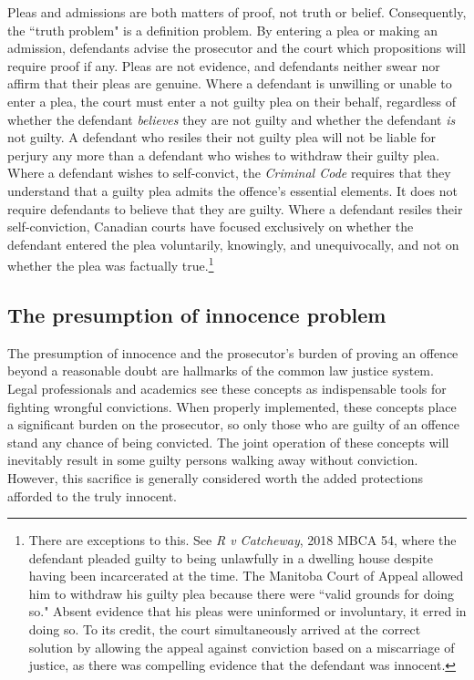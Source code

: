 Pleas and admissions are both matters of proof, not truth or belief. Consequently, the ``truth problem" is a definition problem. By entering a plea or making an admission, defendants advise the prosecutor and the court which propositions will require proof if any. Pleas are not evidence, and defendants neither swear nor affirm that their pleas are genuine. Where a defendant is unwilling or unable to enter a plea, the court must enter a not guilty plea on their behalf, regardless of whether the defendant \textit{believes} they are not guilty and whether the defendant \textit{is} not guilty. A defendant who resiles their not guilty plea will not be liable for perjury any more than a defendant who wishes to withdraw their guilty plea. Where a defendant wishes to self-convict, the \textit{Criminal Code} requires that they understand that a guilty plea admits the offence's essential elements. It does not require defendants to believe that they are guilty. Where a defendant resiles their self-conviction, Canadian courts have focused exclusively on whether the defendant entered the plea voluntarily, knowingly, and unequivocally, and not on whether the plea was factually true.\footnote{There are exceptions to this. See \textit{R v Catcheway}, 2018 MBCA 54, where the defendant pleaded guilty to being unlawfully in a dwelling house despite having been incarcerated at the time. The Manitoba Court of Appeal allowed him to withdraw his guilty plea because there were ``valid grounds for doing so." Absent evidence that his pleas were uninformed or involuntary, it erred in doing so. To its credit, the court simultaneously arrived at the correct solution by allowing the appeal against conviction based on a miscarriage of justice, as there was compelling evidence that the defendant was innocent.}

\subsection{The presumption of innocence problem}

The presumption of innocence and the prosecutor's burden of proving an offence beyond a reasonable doubt are hallmarks of the common law justice system. Legal professionals and academics see these concepts as indispensable tools for fighting wrongful convictions. When properly implemented, these concepts place a significant burden on the prosecutor, so only those who are guilty of an offence stand any chance of being convicted. The joint operation of these concepts will inevitably result in some guilty persons walking away without conviction. However, this sacrifice is generally considered worth the added protections afforded to the truly innocent. 

